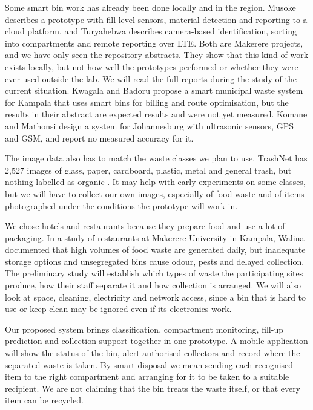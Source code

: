\documentclass[12pt,a4paper]{report}
\begin{document}
Some smart bin work has already been done locally and in the region. Musoke \cite{musoke} describes a prototype with fill-level sensors, material detection and reporting to a cloud platform, and Turyahebwa \cite{turyahebwa} describes camera-based identification, sorting into compartments and remote reporting over LTE. Both are Makerere projects, and we have only seen the repository abstracts. They show that this kind of work exists locally, but not how well the prototypes performed or whether they were ever used outside the lab. We will read the full reports during the study of the current situation. Kwagala and Badoru \cite{kwagala} propose a smart municipal waste system for Kampala that uses smart bins for billing and route optimisation, but the results in their abstract are expected results and were not yet measured. Komane and Mathonsi \cite{komane} design a system for Johannesburg with ultrasonic sensors, GPS and GSM, and report no measured accuracy for it.

The image data also has to match the waste classes we plan to use. TrashNet has 2,527 images of glass, paper, cardboard, plastic, metal and general trash, but nothing labelled as organic \cite{yang,white}. It may help with early experiments on some classes, but we will have to collect our own images, especially of food waste and of items photographed under the conditions the prototype will work in.

We chose hotels and restaurants because they prepare food and use a lot of packaging. In a study of restaurants at Makerere University in Kampala, Walina \cite{walina} documented that high volumes of food waste are generated daily, but inadequate storage options and unsegregated bins cause odour, pests and delayed collection. The preliminary study will establish which types of waste the participating sites produce, how their staff separate it and how collection is arranged. We will also look at space, cleaning, electricity and network access, since a bin that is hard to use or keep clean may be ignored even if its electronics work.

Our proposed system brings classification, compartment monitoring, fill-up prediction and collection support together in one prototype. A mobile application will show the status of the bin, alert authorised collectors and record where the separated waste is taken. By smart disposal we mean sending each recognised item to the right compartment and arranging for it to be taken to a suitable recipient. We are not claiming that the bin treats the waste itself, or that every item can be recycled.
\end{document}
